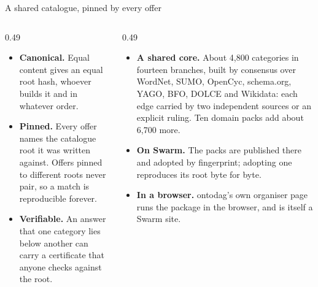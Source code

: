 \documentclass[aspectratio=169,11pt]{beamer}
\begin{document}
{\begin{frame}{A shared catalogue, pinned by every offer}
  \begin{columns}[T]
    \begin{column}{0.49\textwidth}
      \small
      \begin{itemize}\setlength{\itemsep}{2mm}
        \item \textbf{Canonical.} Equal content gives an equal root hash, whoever builds it and in whatever order.
        \item \textbf{Pinned.} Every offer names the catalogue root it was written against. Offers pinned to different roots never pair, so a match is reproducible forever.
        \item \textbf{Verifiable.} An answer that one category lies below another can carry a certificate that anyone checks against the root.
      \end{itemize}
    \end{column}
    \begin{column}{0.49\textwidth}
      \small
      \begin{itemize}\setlength{\itemsep}{2mm}
        \item \textbf{A shared core.} About 4,800 categories in fourteen branches, built by consensus over WordNet, SUMO, OpenCyc, schema.org, YAGO, BFO, DOLCE and Wikidata: each edge carried by two independent sources or an explicit ruling. Ten domain packs add about 6,700 more.
        \item \textbf{On Swarm.} The packs are published there and adopted by fingerprint; adopting one reproduces its root byte for byte.
        \item \textbf{In a browser.} ontodag's own organiser page runs the package in the browser, and is itself a Swarm site.
      \end{itemize}
    \end{column}
  \end{columns}
\end{frame}
}


\end{document}
